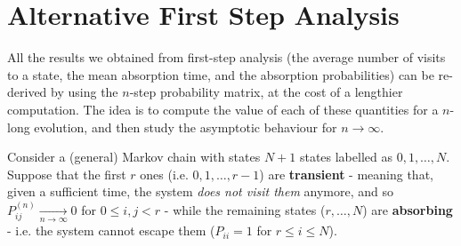 \documentclass[../template.tex]{subfiles}
\begin{document}

\section{Alternative First Step Analysis}
All the results we obtained from first-step analysis (the average number of visits to a state, the mean absorption time, and the absorption probabilities) can be re-derived by using the $n$-step probability matrix, at the cost of a lengthier computation. The idea is to compute the value of each of these quantities for a $n$-long evolution, and then study the asymptotic behaviour for $n \to \infty$.

\medskip

Consider a (general) Markov chain with states $N+1$ states labelled as $0,1,\dots, N$. Suppose that the first $r$ ones (i.e. $0,1,\dots, r-1$) are \textbf{transient} - meaning that, given a sufficient time, the system \textit{does not visit them} anymore, and so $P_{ij}^{(n)}  \xrightarrow[n \to \infty]{} 0$ for $0\leq i,j < r$ - while the remaining states ($r,\dots, N$) are \textbf{absorbing} - i.e. the system cannot escape them ($P_{i i} = 1$ for $r \leq i \leq N$).
\end{document}
